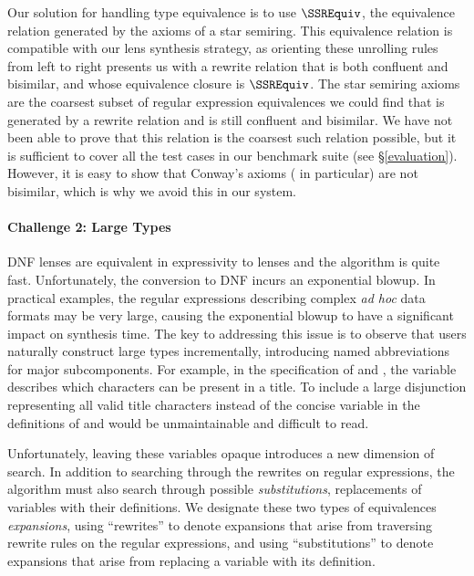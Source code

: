 \documentclass[acmsmall,screen]{acmart}
\begin{document}
Our solution for handling type equivalence is to use $\SSREquiv$, the equivalence relation
generated by the axioms of a star semiring.
This equivalence relation is compatible with our lens synthesis strategy, as
orienting these unrolling rules from left to right presents us with a rewrite
relation that is both confluent and bisimilar, and whose equivalence closure is
$\SSREquiv$.
The star semiring axioms are the 
coarsest subset of regular expression equivalences we could
find that is generated by a rewrite relation and is still confluent and
bisimilar.  We have not been able to prove that this relation is the coarsest
such relation possible, but it is sufficient to cover all the test
cases in our benchmark suite (see \S\ref{evaluation}).  However, it is easy to
show that Conway's axioms (\ProductstarRule{} in particular) are not bisimilar,
which is why we avoid this in our system.

\paragraph*{Challenge 2: Large Types}
DNF lenses are equivalent in expressivity to lenses and the algorithm
\SynthDNFLens{} is quite fast.
Unfortunately, the conversion to DNF incurs an exponential blowup.  In practical
examples, the regular expressions describing complex {\em ad hoc} data
formats may be very large, causing the exponential blowup to have a significant
impact on synthesis time.  The key to addressing this issue is to observe that
users naturally construct large types incrementally, introducing named
abbreviations for major subcomponents.  For example, in the
specification of \LegacyTitle{} and
\ModernTitle{}, the variable \TextChar{} describes which characters
can be present in a title.
To include a large disjunction representing all valid title characters
instead of the concise variable \TextChar{} in the definitions of \LegacyTitle{}
and \ModernTitle{} would be unmaintainable and difficult to read.

Unfortunately, leaving these variables opaque introduces a new dimension of
search.  In addition to searching through the rewrites on regular expressions,
the algorithm must also search through possible \emph{substitutions},
replacements of variables with their definitions.
We designate these two types of equivalences \emph{expansions}, using
``rewrites'' to denote expansions that arise from traversing rewrite rules on
the regular expressions, and
using ``substitutions'' to denote expansions that arise from replacing a
variable with its definition.
\end{document}
